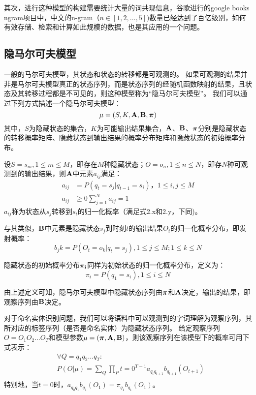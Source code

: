 其次，进行这种模型的构建需要统计大量的词共现信息，谷歌进行的google books ngram项目中，中文的n-gram（$n\in[1, 2, \dots, 5])$数量已经达到了百亿级别，如何有效存储、检索和计算如此规模的数据，也是其应用的一个问题。
\subsection{隐马尔可夫模型}
一般的马尔可夫模型，其状态和状态的转移都是可观测的。
如果可观测的结果并非是马尔可夫模型真正的状态序列，而是状态序列的经随机函数映射的结果，且状态及其转移过程都是不可见的，则这种模型称为“隐马尔可夫模型”。
我们可以通过下列方式描述一个隐马尔可夫模型：
\begin{equation}
    \mu =(S, K, \boldsymbol{\mathbf{A}}, \boldsymbol{\mathbf{B}}, \boldsymbol{\mathbf{\pi}})
\end{equation}
其中，$S$为隐藏状态的集合，$K$为可能输出结果集合，$\boldsymbol{\mathbf{A}}$、$\boldsymbol{\mathbf{B}}$、$\boldsymbol{\mathbf{\pi}}$分别是隐藏状态的转移概率矩阵、隐藏状态到输出结果的概率分布矩阵和隐藏状态的初始概率分布。

设$S={s_m}, 1\leq m \leq M$，即存在$M$种隐藏状态；$O={o_n}, 1\leq n\leq N$，即存$N$种可观测到的输出结果，则$\boldsymbol{\mathbf{A}}$中元素$a_{ij}$满足：
\begin{align}
    a_{ij} &= P(q_t = s_j|q_{t-1} = s_i)， 1\leq i,j \leq M\\
    a_{ij} &\geq 0
    \sum^{N}_{j=1}a_{ij} = 1
\end{align}
$a_{ij}$称为状态从$s_j$转移到$s_i$的归一化概率（满足式2.x和2.y，下同)。

与其类似，$\boldsymbol{\mathbf{B}}$中元素是隐藏状态$s_j$到时刻$t$的输出结果$O_t$的归一化概率分布，即发射概率：
\begin{equation}
    b_j{k} = P(O_t = o_k |q_t = s_j), 1\leq j \leq M; 1\leq k\leq N
\end{equation}

隐藏状态的初始概率分布$\boldsymbol{\mathbf{\pi_i}}$同样为初始状态的归一化概率分布，定义为：
\begin{equation}
    \pi_i = P(q_1 = s_i), 1\leq i \leq N
\end{equation}

由上述定义可知，隐马尔可夫模型中隐藏状态序列由$\boldsymbol{\mathbf{\pi}}$和$\boldsymbol{\mathbf{A}}$决定，输出的结果，即观察序列由$\boldsymbol{\mathbf{B}}$决定。

对于命名实体识别问题，我们可以将语料中可以观测到的字词理解为观察序列，其所对应的标签序列（是否是命名实体）为隐藏状态序列。
给定观察序列$O = O_1 O_2\dots O_T$和模型参数$\mu = (\boldsymbol{\mathbf{\pi}},\boldsymbol{\mathbf{A}},\boldsymbol{\mathbf{B}})$，则该观察序列在该模型下的概率可用下式表示：
\begin{align}
    &\forall Q = q_1 q_2 \dots q_T:\\
    &P(O|\mu) = \sum_Q \prod_P{t=0}^{T-1}a_{q_t q_{t+1}}b_{q_{t+1}}(O_{t+1})\\
\end{align}
特别地，当$t=0$时，$a_{q_0 q_1}b_{q_1}(O_1) = \pi_{q_1}b_{q_1}(O_1)$。

